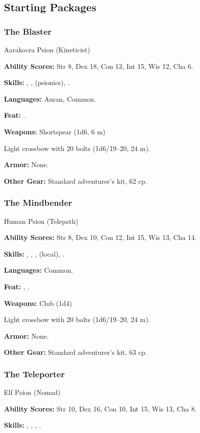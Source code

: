 \subsection{Starting Packages}
\subsubsection{The Blaster}
Aarakocra Psion (Kineticist)

\textbf{Ability Scores:} Str 8, Dex 18, Con 13, Int 15, Wis 12, Cha 6.

\textbf{Skills:} , ,  (psionics), .

\textbf{Languages:} Auran, Common.

\textbf{Feat:} .

\textbf{Weapons:} Shortspear (1d6, 6 m)

Light crossbow with 20 bolts (1d6/19--20, 24 m).

\textbf{Armor:} None.

\textbf{Other Gear:} Standard adventurer's kit, 62 cp.

\subsubsection{The Mindbender}
Human Psion (Telepath)

\textbf{Ability Scores:} Str 8, Dex 10, Con 12, Int 15, Wis 13, Cha 14.

\textbf{Skills:} , , ,  (local), .

\textbf{Languages:} Common.

\textbf{Feat:} , .

\textbf{Weapons:} Club (1d4)

Light crossbow with 20 bolts (1d6/19--20, 24 m).

\textbf{Armor:} None.

\textbf{Other Gear:} Standard adventurer's kit, 63 cp.

\subsubsection{The Teleporter}
Elf Psion (Nomad)

\textbf{Ability Scores:} Str 10, Dex 16, Con 10, Int 15, Wis 13, Cha 8.

\textbf{Skills:} , , , .

